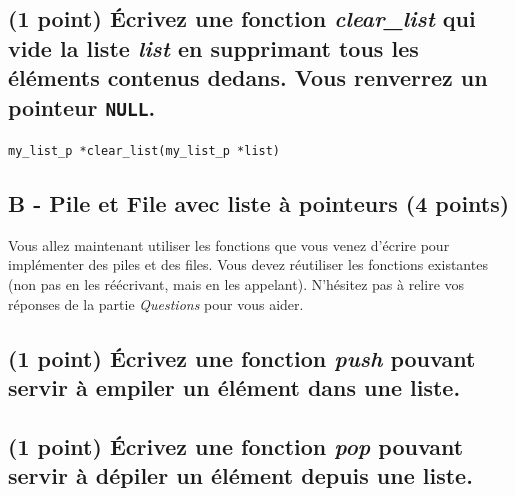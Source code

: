 \documentclass[11pt,a4paper]{article}
\begin{document}
\begin{center}
\end{center}

\newpage

\subsection{(1 point) \'Ecrivez une fonction \og \textit{clear\_list} \fg{} qui vide la liste \textit{list} en supprimant tous les éléments contenus dedans. Vous renverrez un pointeur \texttt{NULL}. }

\bigskip

\texttt{my\_list\_p *clear\_list(my\_list\_p *list)}

\begin{center}
\end{center}




\subsection*{B - Pile et File avec liste à pointeurs (4 points)}

Vous allez maintenant utiliser les fonctions que vous venez d'écrire pour implémenter des piles et des files.
Vous devez réutiliser les fonctions existantes (non pas en les réécrivant, mais en les appelant).
N'hésitez pas à relire vos réponses de la partie \textit{Questions} pour vous aider.

\subsection{(1 point) \'Ecrivez une fonction \og \textit{push} \fg{} pouvant servir à empiler un élément dans une liste. }

\bigskip

\begin{center}
\end{center}

\newpage

\subsection{(1 point) \'Ecrivez une fonction \og \textit{pop} \fg{} pouvant servir à dépiler un élément depuis une liste. }

\bigskip

\begin{center}
\end{center}
\end{document}
